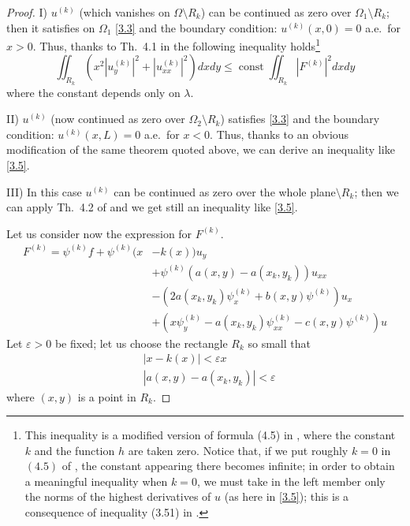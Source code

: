 \documentclass[a4paper,12pt,leqno]{article}
\numberwithin{equation}{section}
\begin{document}
\begin{proof}
\medskip

I) $u^{(k)}$ (which vanishes on $\Omega \setminus R_{k}$) can be continued as zero over $\Omega_{1} \setminus R_{k}$; then it satisfies on $\Omega_{1}$ \cref{3.3} and the boundary condition: $u^{(k)}(x, 0)=0$ a.e.\ for $x>0$. Thus, thanks to Th.\ 4.1 in \cite{zbMATH03479447} the following inequality holds\footnote{This inequality is a modified version of formula (4.5) in \cite{zbMATH03479447}, where the constant $k$ and the function $h$ are taken zero. Notice that, if we put roughly $k=0$ in $(4.5)$ of \cite{zbMATH03479447}, the constant appearing there becomes infinite; in order to obtain a meaningful inequality when $k = 0$, we must take in the left member only the norms of the highest derivatives of $u$ (as here in \eqref{3.5}); this is a consequence of inequality (3.51) in \cite{zbMATH03479447}.}
\begin{equation} \label{3.5}
	\iint_{R_{k}} \left(x^{2}\left|u_{y}^{(k)}\right|^{2}+\left|u_{xx}^{(k)}\right|^{2}\right) d x d y \leqslant \operatorname{const} \iint_{R_k} \left|F^{(k)}\right|^{2} d x d y
\end{equation}
where the constant depends only on $\lambda .$

\medskip

II) $u^{(k)}$ (now continued as zero over $\Omega_{2} \setminus R_{k}$) satisfies \eqref{3.3} and the boundary condition: $u^{(k)}(x, L)=0$ a.e.\ for $x<0$. Thus, thanks to an obvious modification of the same theorem quoted above, we can derive an inequality like \eqref{3.5}.

\medskip

III) In this case $u^{(k)}$ can be continued as zero over the whole plane$\setminus R_{k}$; then we can apply Th.\ 4.2 of \cite{zbMATH03479447} and we get still an inequality like \eqref{3.5}.

\medskip

Let us consider now the expression for $F^{(k)}$.
\begin{equation} \label{3.6}
	\begin{aligned}
		F^{(k)}=\psi^{(k)} f+\psi^{(k)}(x&-k(x)) u_{y}\\
		&+\psi^{(k)}\left(a(x, y)-a\left(x_{k}, y_{k}\right)\right) u_{xx} \\
		&-(2 a\left(x_{k}, y_{k}\right) \psi_{x}^{(k)}+b(x, y) \psi^{(k)}) u_{x} \\
		&+(x \psi_{y}^{(k)}-a\left(x_{k}, y_{k}\right) \psi_{x x}^{(k)}-c(x, y) \psi^{(k)}) u
	\end{aligned}
\end{equation}
Let $\varepsilon>0$ be fixed; let us choose the rectangle $R_{k}$ so small that
\begin{equation*}
	\begin{aligned}
		&|x-k(x)|<\varepsilon x \\
		&|a(x, y)-a\left(x_{k}, y_{k}\right)|<\varepsilon
	\end{aligned}
\end{equation*}
where $(x, y)$ is a point in $R_{k}$. 


\end{proof}
\end{document}
